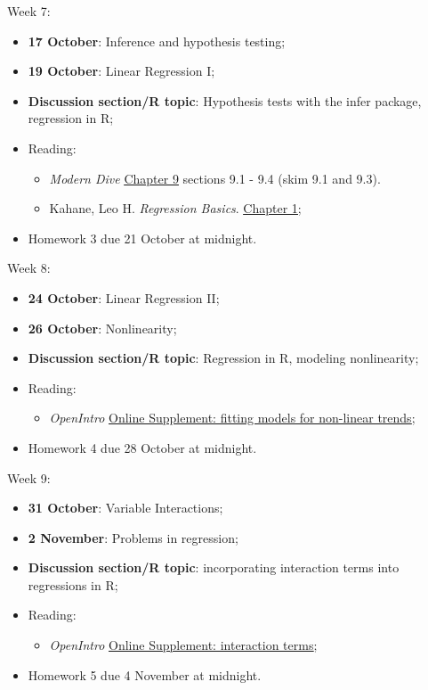 \documentclass[12pt]{article}
\begin{document}
\noindent Week 7:
\begin{itemize}
\item \textbf{17 October}: Inference and hypothesis testing;
\item \textbf{19 October}: Linear Regression I;
\item \textbf{Discussion section/R topic}: Hypothesis tests with the infer package, regression in R;
\item Reading: 
\begin{itemize}
\item \textit{Modern Dive} \href{https://moderndive.com/9-hypothesis-testing.html}{\color{blue}\underline{Chapter 9}} sections 9.1 - 9.4 (skim 9.1 and 9.3).
\item Kahane, Leo H. \textit{Regression Basics}. \href{https://methods-sagepub-com.ezproxy.library.wisc.edu/book/regression-basics/n1.xml}{\color{blue}\underline{Chapter 1}};
\end{itemize}
\item Homework 3 due 21 October at midnight.
\end{itemize}

\noindent Week 8:
\begin{itemize}
\item \textbf{24 October}: Linear Regression II;
\item \textbf{26 October}: Nonlinearity;
\item \textbf{Discussion section/R topic}: Regression in R, modeling nonlinearity;
\item Reading: 
\begin{itemize}
\item \textit{OpenIntro} \href{https://www.openintro.org/redirect.php?go=stat_extra_nonlinear_relationships&referrer=os4_pdf}{\color{blue}\underline{Online Supplement: fitting models for non-linear trends}};
\end{itemize}
\item Homework 4 due 28 October at midnight.
\end{itemize}

\noindent Week 9:
\begin{itemize}
\item \textbf{31 October}: Variable Interactions;
\item \textbf{2 November}: Problems in regression; %
\item \textbf{Discussion section/R topic}: incorporating interaction terms into regressions in R;
\item Reading:
\begin{itemize}
\item \textit{OpenIntro} \href{https://www.openintro.org/redirect.php?go=stat_extra_interaction_effects&referrer=os4_pdf}{\color{blue}\underline{Online Supplement: interaction terms}};
\end{itemize}
\item Homework 5 due 4 November at midnight.
\end{itemize}
\end{document}
